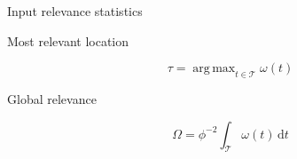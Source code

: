 \documentclass[final]{beamer}
\DeclareMathOperator*{\argmax}{arg\,max}
\begin{document}
\begin{frame}[t]
{\begin{minipage}[t][76cm][t]{58cm}
{\begin{minipage}[t][40cm][t]{28cm}
          \begin{block}{Input relevance statistics}
            \begin{minipage}[t]{.45\linewidth}
              \begin{center}
                Most relevant location
              \end{center}
              \begin{equation}
                \tau=\argmax_{t\in\mathcal{T}}\omega(t)
              \end{equation}
            \end{minipage}
            \begin{minipage}[t]{.45\linewidth}
              \begin{center}
                Global relevance
              \end{center}
              \begin{equation}
                \Omega=\phi^{-2}\int_\mathcal{T}\omega(t)\,\mathrm{d}t
              \end{equation}
            \end{minipage}
          \end{block}


\end{minipage}}
\end{minipage}}
\end{frame}
\end{document}
